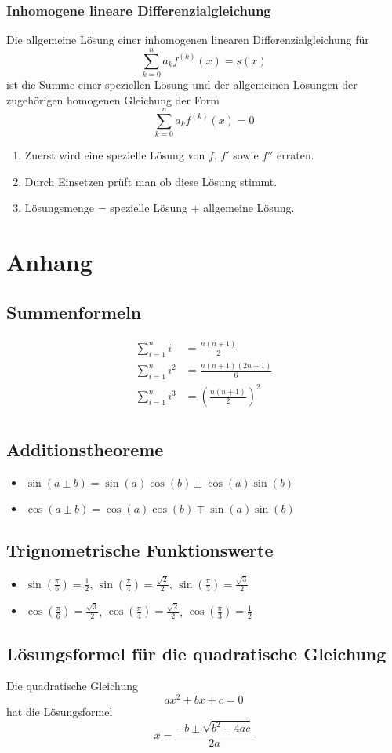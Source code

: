 \subsubsection{Inhomogene lineare Differenzialgleichung}
Die allgemeine Lösung einer inhomogenen linearen Differenzialgleichung
für
\[ \sum_{k=0}^{n} a_{k}f^{(k)}(x) = s(x) \]
ist die Summe einer speziellen Lösung  und  der allgemeinen
Lösungen der zugehörigen homogenen Gleichung der Form
\[ \sum_{k=0}^{n} a_{k}f^{(k)}(x) = 0 \]
\begin{enumerate}
  \item Zuerst wird eine spezielle Lösung von $f$, $f'$ sowie $f''$
    erraten.
  \item Durch Einsetzen prüft man ob diese Lösung stimmt.
  \item Lösungsmenge = spezielle Lösung + allgemeine Lösung.
\end{enumerate}

\section{Anhang}
\subsection{Summenformeln}
\[ \begin{aligned}
  \sum_{i=1}^{n}i     & = \frac{n(n+1)}{2} \\
  \sum_{i=1}^{n}i^2   & = \frac{n(n+1)(2n+1)}{6} \\
  \sum_{i=1}^{n}i^3   & = \left(\frac{n(n+1)}{2}\right)^2 \\
\end{aligned} \]
\subsection{Additionstheoreme}
\begin{itemize}
  \item $\sin(a \pm b) = \sin(a) \cos(b) \pm \cos(a) \sin(b)$
  \item $\cos(a \pm b) = \cos(a) \cos(b) \mp \sin(a) \sin(b)$
\end{itemize}
\subsection{Trignometrische Funktionswerte}
\begin{itemize}
  \item $\sin(\frac{\pi}{6}) = \frac{1}{2}$,
        $\sin(\frac{\pi}{4}) = \frac{\sqrt{2}}{2}$,
        $\sin(\frac{\pi}{3}) = \frac{\sqrt{3}}{2}$
  \item $\cos(\frac{\pi}{6}) = \frac{\sqrt{3}}{2}$,
        $\cos(\frac{\pi}{4}) = \frac{\sqrt{2}}{2}$,
        $\cos(\frac{\pi}{3}) = \frac{1}{2}$
\end{itemize}
\subsection{Lösungsformel für die quadratische Gleichung}
Die quadratische Gleichung
\[ ax^2 + bx + c = 0 \]
hat die Lösungsformel
\[ x = \frac{-b \pm \sqrt{b^2 - 4ac}}{2a} \]
